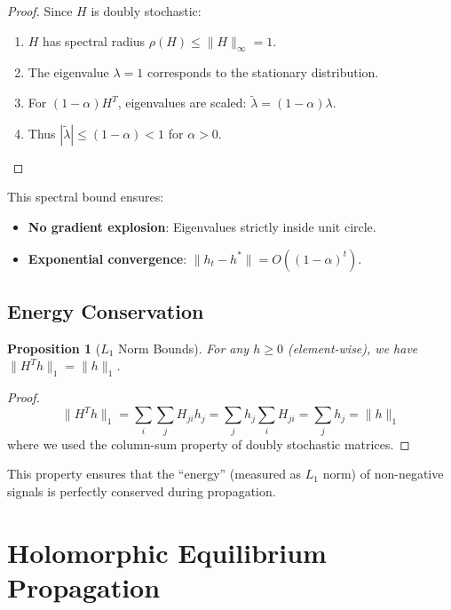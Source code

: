\documentclass[11pt,a4paper]{article}
\newtheorem{proposition}[theorem]{Proposition}
\begin{document}
\begin{proof}
Since $H$ is doubly stochastic:
\begin{enumerate}
    \item $H$ has spectral radius $\rho(H) \leq \|H\|_\infty = 1$.
    \item The eigenvalue $\lambda = 1$ corresponds to the stationary distribution.
    \item For $(1-\alpha)H^T$, eigenvalues are scaled: $\tilde{\lambda} = (1-\alpha)\lambda$.
    \item Thus $|\tilde{\lambda}| \leq (1-\alpha) < 1$ for $\alpha > 0$.
\end{enumerate}
\end{proof}

This spectral bound ensures:
\begin{itemize}
    \item \textbf{No gradient explosion}: Eigenvalues strictly inside unit circle.
    \item \textbf{Exponential convergence}: $\|h_t - h^*\| = O((1-\alpha)^t)$.
\end{itemize}

\subsection{Energy Conservation}

\begin{proposition}[$L_1$ Norm Bounds]
\label{prop:l1bounds}
For any $h \geq 0$ (element-wise), we have $\|H^Th\|_1 = \|h\|_1$.
\end{proposition}

\begin{proof}
\begin{equation}
\|H^Th\|_1 = \sum_i \sum_j H_{ji}h_j = \sum_j h_j \sum_i H_{ji} = \sum_j h_j = \|h\|_1
\end{equation}
where we used the column-sum property of doubly stochastic matrices.
\end{proof}

This property ensures that the ``energy'' (measured as $L_1$ norm) of non-negative signals is perfectly conserved during propagation.

\section{Holomorphic Equilibrium Propagation}
\label{sec:learning}
\end{document}
